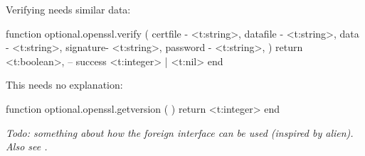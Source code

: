 Verifying needs similar data:

\starttyping[option=LUA]
function optional.openssl.verify (
    {
        certfile - <t:string>,
        datafile - <t:string>,
        data     - <t:string>,
        signature- <t:string>,
        password - <t:string>,
    }
)
    return
        <t:boolean>, -- success
        <t:integer> | <t:nil>
end
\stoptyping

This needs no explanation:

\starttyping[option=LUA]
function optional.openssl.getversion ( )
    return <t:integer>
end
\stoptyping

\stopsubsubsubject

\stopsubsection

\startsubsection[title=Foreign]

{\em Todo: something about how the foreign interface can be used (inspired by
alien). Also see .}

\stopsubsection

\stopsection

\stopdocument

%
